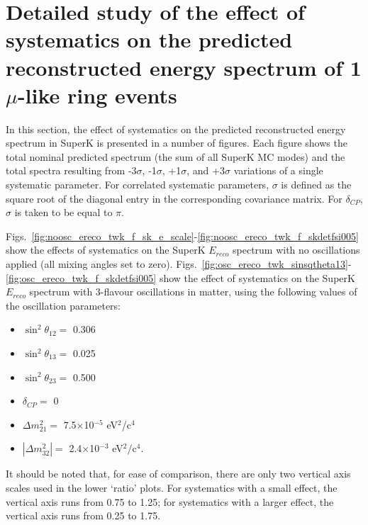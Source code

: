 \clearpage

\section{Detailed study of the effect of systematics on the predicted reconstructed energy spectrum of 1 $\mu$-like ring events}
\label{sec:spectrum_systematics}

In this section, the effect of systematics on the predicted reconstructed energy spectrum in SuperK is presented in a number of figures.
Each figure shows the total nominal predicted spectrum (the sum of all SuperK MC modes) and the total spectra resulting from -3$\sigma$, -1$\sigma$, +1$\sigma$, 
and +3$\sigma$ variations of a single systematic parameter.
For correlated systematic parameters, $\sigma$ is defined as the square root of the diagonal entry in the corresponding covariance matrix.
For $\delta_{CP}$, $\sigma$ is taken to be equal to $\pi$.

Figs.\ \ref{fig:noosc_ereco_twk_f_sk_e_scale}-\ref{fig:noosc_ereco_twk_f_skdetfsi005} show the effects of systematics on the SuperK $E_{reco}$ 
spectrum with no oscillations applied (all mixing angles set to zero).
Figs.\ \ref{fig:osc_ereco_twk_sinsqtheta13}-\ref{fig:osc_ereco_twk_f_skdetfsi005} show the effect of systematics on the SuperK $E_{reco}$ spectrum 
with 3-flavour oscillations in matter, using the following values of the oscillation parameters:
\begin{itemize}
\item $\sin^2\theta_{12} = $ 0.306
\item $\sin^2\theta_{13} = $ 0.025
\item $\sin^2\theta_{23} = $ 0.500
\item $\delta_{CP} = $        0
\item $\Delta m^2_{21} = $    7.5$\times$10$^{-5}$ eV$^{2}$/c$^{4}$
\item $|\Delta m^2_{32}| = $  2.4$\times$10$^{-3}$ eV$^{2}$/c$^{4}$.
\end{itemize}
It should be noted that, for ease of comparison, there are only two vertical axis scales used in the lower `ratio' plots. For systematics with a small 
effect, the vertical axis runs from 0.75 to 1.25; for systematics with a larger effect, the vertical axis runs from 0.25 to 1.75.









